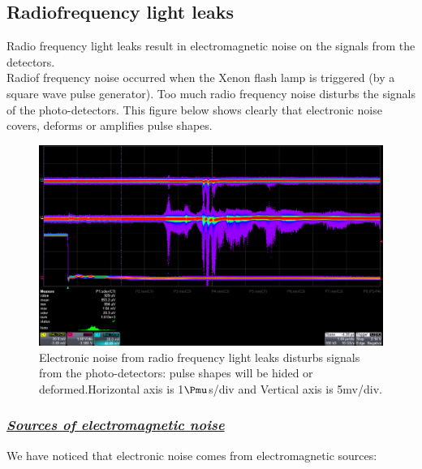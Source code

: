 \documentclass[a4paper, 11pt]{report}%
\newcommand{\xfl}{Xenon flash lamp }
\begin{document}
  \subsection{Radiofrequency light leaks}
  
  Radio frequency light leaks result in electromagnetic noise on the signals from the detectors.\\  
  Radiof frequency noise occurred when the \xfl is triggered (by a square wave pulse generator). Too much radio frequency noise 
  disturbs the signals of the photo-detectors. This figure below shows clearly that electronic noise covers, deforms or amplifies pulse shapes.
  
  \begin{figure}[!hbtp]
  \centering
    \includegraphics[totalheight=0.3\textwidth,trim=0.3cm 6.6cm 0.1cm 0cm, clip=true]{../Pictures/Pictures_oscilloscope/bad_noise.png}
  \caption{Electronic noise from radio frequency light leaks disturbs signals from the photo-detectors: pulse shapes will be 
  hided or deformed.Horizontal axis is 1$\Pmu$s/div and Vertical axis is 5mv/div.}
  \label{fig:noise_signal}
  \end{figure}
  
  \subsubsection{\textit{\underline{Sources of electromagnetic noise}}}
  
  We have noticed that electronic noise comes from electromagnetic sources:
\end{document}

